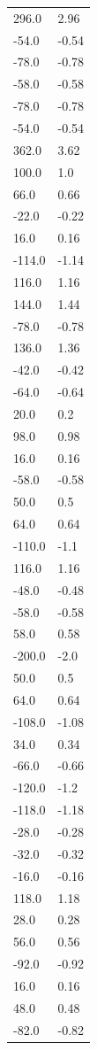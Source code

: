 \begin{longtable}{ll}
296.0 & 2.96 \\
-54.0 & -0.54 \\
-78.0 & -0.78 \\
-58.0 & -0.58 \\
-78.0 & -0.78 \\
-54.0 & -0.54 \\
362.0 & 3.62 \\
100.0 & 1.0 \\
66.0 & 0.66 \\
-22.0 & -0.22 \\
16.0 & 0.16 \\
-114.0 & -1.14 \\
116.0 & 1.16 \\
144.0 & 1.44 \\
-78.0 & -0.78 \\
136.0 & 1.36 \\
-42.0 & -0.42 \\
-64.0 & -0.64 \\
20.0 & 0.2 \\
98.0 & 0.98 \\
16.0 & 0.16 \\
-58.0 & -0.58 \\
50.0 & 0.5 \\
64.0 & 0.64 \\
-110.0 & -1.1 \\
116.0 & 1.16 \\
-48.0 & -0.48 \\
-58.0 & -0.58 \\
58.0 & 0.58 \\
-200.0 & -2.0 \\
50.0 & 0.5 \\
64.0 & 0.64 \\
-108.0 & -1.08 \\
34.0 & 0.34 \\
-66.0 & -0.66 \\
-120.0 & -1.2 \\
-118.0 & -1.18 \\
-28.0 & -0.28 \\
-32.0 & -0.32 \\
-16.0 & -0.16 \\
118.0 & 1.18 \\
28.0 & 0.28 \\
56.0 & 0.56 \\
-92.0 & -0.92 \\
16.0 & 0.16 \\
48.0 & 0.48 \\
-82.0 & -0.82 \\

\end{longtable}
